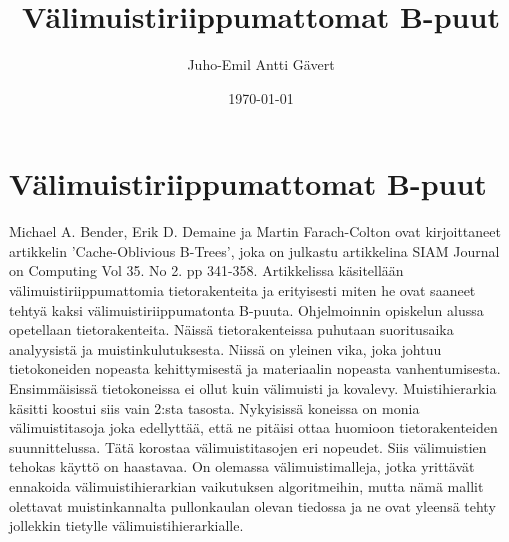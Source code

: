 \documentclass[finnish]{tktltiki2}
\title{Välimuistiriippumattomat B-puut}
\author{Juho-Emil Antti Gävert}
\date{\today}
\theoremstyle{definition}
\theoremstyle{remark}
\begin{document}

\maketitle        %
\makeabstract     %

\newpage          %



\section*{Välimuistiriippumattomat B-puut}


Michael A. Bender, Erik D. Demaine ja Martin Farach-Colton ovat kirjoittaneet
artikkelin 'Cache-Oblivious B-Trees', joka on julkastu artikkelina SIAM Journal
on Computing Vol 35. No 2. pp 341-358. Artikkelissa käsitellään
välimuistiriippumattomia tietorakenteita ja erityisesti miten he ovat saaneet
tehtyä kaksi välimuistiriippumatonta B-puuta.
\newline \indent Ohjelmoinnin opiskelun alussa opetellaan tietorakenteita.
Näissä tietorakenteissa puhutaan suoritusaika analyysistä ja
muistinkulutuksesta. Niissä on yleinen vika, joka johtuu tietokoneiden nopeasta
kehittymisestä ja materiaalin nopeasta vanhentumisesta. Ensimmäisissä
tietokoneissa ei ollut kuin välimuisti ja kovalevy. Muistihierarkia käsitti
koostui siis vain 2:sta tasosta. Nykyisissä koneissa on monia välimuistitasoja
joka edellyttää, että ne pitäisi ottaa huomioon tietorakenteiden
suunnittelussa. Tätä korostaa välimuistitasojen eri nopeudet. Siis välimuistien
tehokas käyttö on haastavaa. On olemassa välimuistimalleja, jotka yrittävät
ennakoida välimuistihierarkian vaikutuksen algoritmeihin, mutta nämä mallit
olettavat muistinkannalta pullonkaulan olevan tiedossa ja ne ovat yleensä tehty
jollekkin tietylle välimuistihierarkialle.



%
%
% 
%

% 
% 
\end{document}
